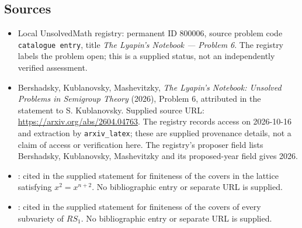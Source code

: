 \documentclass[11pt]{article}
\begin{document}
\subsection{Sources}
\begin{itemize}
\item Local UnsolvedMath registry: permanent ID \(800006\), source problem code \texttt{catalogue entry}, title \emph{The Lyapin's Notebook --- Problem 6}. The registry labels the problem open; this is a supplied status, not an independently verified assessment.
\item Bershadsky, Kublanovsky, Mashevitzky, \emph{The Lyapin's Notebook: Unsolved Problems in Semigroup Theory} (2026), Problem 6, attributed in the statement to S. Kublanovsky. Supplied source URL: \url{https://arxiv.org/abs/2604.04763}. The registry records access on 2026-10-16 and extraction by \texttt{arxiv\_latex}; these are supplied provenance details, not a claim of access or verification here. The registry's proposer field lists Bershadsky, Kublanovsky, Mashevitzky and its proposed-year field gives 2026.
\item [Kubl5]: cited in the supplied statement for finiteness of the covers in the lattice satisfying \(x^2=x^{n+2}\). No bibliographic entry or separate URL is supplied.
\item [Kubl4]: cited in the supplied statement for finiteness of the covers of every subvariety of \(RS_1\). No bibliographic entry or separate URL is supplied.
\end{itemize}
\end{document}
